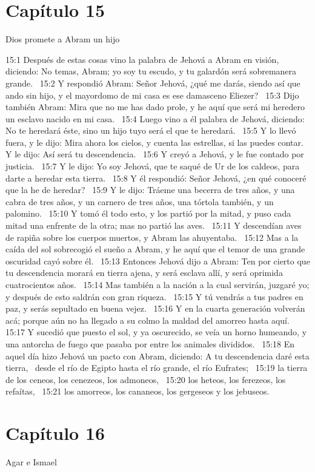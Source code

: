 \section*{Capítulo 15}
Dios promete a Abram un hijo  

15:1 Después de estas cosas vino la palabra de Jehová a Abram en visión, diciendo: No temas, Abram; yo soy tu escudo, y tu galardón será sobremanera grande.  
15:2 Y respondió Abram: Señor Jehová, ¿qué me darás, siendo así que ando sin hijo, y el mayordomo de mi casa es ese damasceno Eliezer?  
15:3 Dijo también Abram: Mira que no me has dado prole, y he aquí que será mi heredero un esclavo nacido en mi casa.  
15:4 Luego vino a él palabra de Jehová, diciendo: No te heredará éste, sino un hijo tuyo será el que te heredará.  
15:5 Y lo llevó fuera, y le dijo: Mira ahora los cielos, y cuenta las estrellas, si las puedes contar. Y le dijo: Así será tu descendencia.  
15:6 Y creyó a Jehová, y le fue contado por justicia.  
15:7 Y le dijo: Yo soy Jehová, que te saqué de Ur de los caldeos, para darte a heredar esta tierra.  
15:8 Y él respondió: Señor Jehová, ¿en qué conoceré que la he de heredar?  
15:9 Y le dijo: Tráeme una becerra de tres años, y una cabra de tres años, y un carnero de tres años, una tórtola también, y un palomino.  
15:10 Y tomó él todo esto, y los partió por la mitad, y puso cada mitad una enfrente de la otra; mas no partió las aves.  
15:11 Y descendían aves de rapiña sobre los cuerpos muertos, y Abram las ahuyentaba.  
15:12 Mas a la caída del sol sobrecogió el sueño a Abram, y he aquí que el temor de una grande oscuridad cayó sobre él.  
15:13 Entonces Jehová dijo a Abram: Ten por cierto que tu descendencia morará en tierra ajena, y será esclava allí, y será oprimida cuatrocientos años.  
15:14 Mas también a la nación a la cual servirán, juzgaré yo; y después de esto saldrán con gran riqueza.  
15:15 Y tú vendrás a tus padres en paz, y serás sepultado en buena vejez.  
15:16 Y en la cuarta generación volverán acá; porque aún no ha llegado a su colmo la maldad del amorreo hasta aquí.  
15:17 Y sucedió que puesto el sol, y ya oscurecido, se veía un horno humeando, y una antorcha de fuego que pasaba por entre los animales divididos.  
15:18 En aquel día hizo Jehová un pacto con Abram, diciendo: A tu descendencia daré esta tierra,  desde el río de Egipto hasta el río grande, el río Eufrates;  
15:19 la tierra de los ceneos, los cenezeos, los admoneos,  
15:20 los heteos, los ferezeos, los refaítas,  
15:21 los amorreos, los cananeos, los gergeseos y los jebuseos.  
\section*{Capítulo 16 }
Agar e Ismael  

